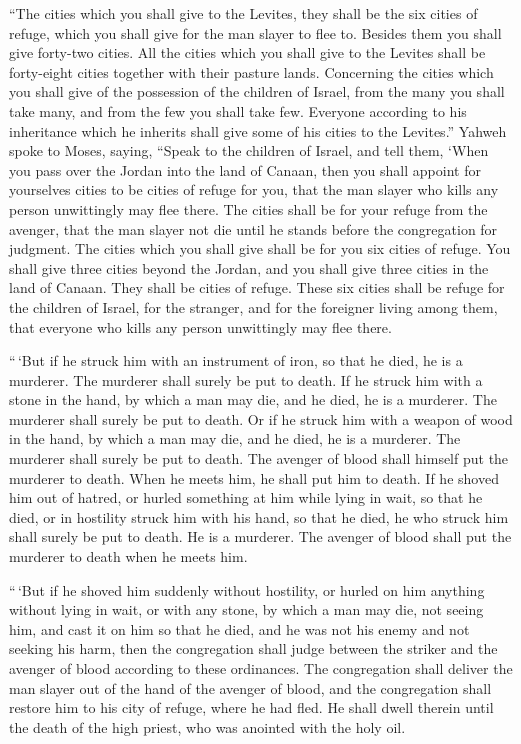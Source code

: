  ``The cities which you shall give to the Levites, they
shall be the six cities of refuge, which you shall give for the man
slayer to flee to. Besides them you shall give forty-two cities.
 All the cities which you shall give to the Levites shall be
forty-eight cities together with their pasture lands. 
Concerning the cities which you shall give of the possession of the
children of Israel, from the many you shall take many, and from the few
you shall take few. Everyone according to his inheritance which he
inherits shall give some of his cities to the Levites.'' 
Yahweh spoke to Moses, saying,  ``Speak to the children of
Israel, and tell them, `When you pass over the Jordan into the land of
Canaan,  then you shall appoint for yourselves cities to be
cities of refuge for you, that the man slayer who kills any person
unwittingly may flee there.  The cities shall be for your
refuge from the avenger, that the man slayer not die until he stands
before the congregation for judgment.  The cities which you
shall give shall be for you six cities of refuge.  You
shall give three cities beyond the Jordan, and you shall give three
cities in the land of Canaan. They shall be cities of refuge.
 These six cities shall be refuge for the children of
Israel, for the stranger, and for the foreigner living among them, that
everyone who kills any person unwittingly may flee there.

 ``\,`But if he struck him with an instrument of iron, so
that he died, he is a murderer. The murderer shall surely be put to
death.  If he struck him with a stone in the hand, by which
a man may die, and he died, he is a murderer. The murderer shall surely
be put to death.  Or if he struck him with a weapon of wood
in the hand, by which a man may die, and he died, he is a murderer. The
murderer shall surely be put to death.  The avenger of
blood shall himself put the murderer to death. When he meets him, he
shall put him to death.  If he shoved him out of hatred, or
hurled something at him while lying in wait, so that he died,
 or in hostility struck him with his hand, so that he died,
he who struck him shall surely be put to death. He is a murderer. The
avenger of blood shall put the murderer to death when he meets him.

 ``\,`But if he shoved him suddenly without hostility, or
hurled on him anything without lying in wait,  or with any
stone, by which a man may die, not seeing him, and cast it on him so
that he died, and he was not his enemy and not seeking his harm,
 then the congregation shall judge between the striker and
the avenger of blood according to these ordinances.  The
congregation shall deliver the man slayer out of the hand of the avenger
of blood, and the congregation shall restore him to his city of refuge,
where he had fled. He shall dwell therein until the death of the high
priest, who was anointed with the holy oil.

